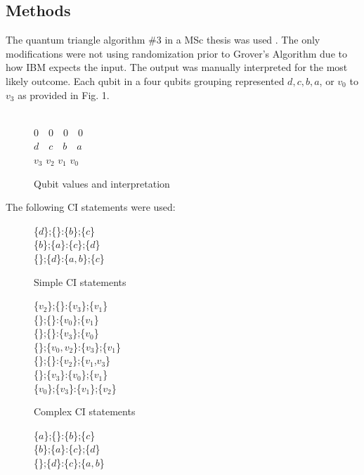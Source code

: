 \documentclass[12pt]{article}
\begin{document}
\begin{flushleft}
\section{Methods}
The quantum triangle algorithm \#3 in a MSc thesis was used \cite{cirasella_classical_2006, cirasella_classical_2006-1}. The only modifications were not using randomization prior to Grover's Algorithm due to how IBM expects the input. The output was manually interpreted for the most likely outcome. Each qubit in a four qubits grouping represented $d,c,b,a$, or $v_0$ to $v_3$ as provided in Fig. 1.\\
\ \\
\begin{figure}[h!]
\begin{center}
0~~0~~0~~0\\
$d$~~$c$~~$b$~~$a$\\
$v_3$ $v_2$ $v_1$ $v_0$
\end{center}
\caption{Qubit values and interpretation}
\end{figure}
The following CI statements were used:\\
\begin{figure}[h!]
\begin{center}
\{$d$\};\{\}:\{$b$\};\{$c$\}\\
\{$b$\};\{$a$\}:\{$c$\};\{$d$\}\\
\{\};\{$d$\}:\{$a,b$\};\{$c$\}
\end{center}
\caption{Simple CI statements}
\end{figure}

\begin{figure}[h!]
	\begin{center}

\{$v_2$\};\{\}:\{$v_3$\};\{$v_1$\}\\
\{\};\{\}:\{$v_0$\};\{$v_1$\}\\
\{\};\{\}:\{$v_3$\};\{$v_0$\}\\
\{\};\{$v_0,v_2$\}:\{$v_3$\};\{$v_1$\}\\
\{\};\{\}:\{$v_2$\};\{$v_1$,$v_3$\}\\
\{\};\{$v_3$\}:\{$v_0$\};\{$v_1$\}\\
\{$v_0$\};\{$v_3$\}:\{$v_1$\};\{$v_2$\}

	\end{center}
	\caption{Complex CI statements}
\end{figure}

\begin{figure}
\begin{center}
\{$a$\};\{\}:\{$b$\};\{$c$\}\\
\{$b$\};\{$a$\}:\{$c$\};\{$d$\}\\
\{\};\{$d$\}:\{$c$\};\{$a,b$\}


\end{center}
\end{figure}
\end{flushleft}
\end{document}
